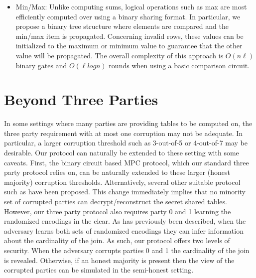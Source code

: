 \begin{itemize}
	\item  Min/Max: Unlike computing sums, logical operations such as max are most efficiently computed over using a binary sharing format. In particular, we propose a binary tree structure where elements are compared and the min/max item is propagated. Concerning invalid rows, these values can be initialized to the maximum or minimum value to guarantee that the other value will be propagated. The overall complexity of this approach is $O(n\ell)$ binary gates and $O(\ell log n)$ rounds when using a basic comparison circuit\cite{aby3}.
\end{itemize}

\section{Beyond Three Parties}


In some settings where many parties are providing tables to be computed on, the three party requirement with at most one corruption may not be adequate. In particular, a larger corruption threshold such as 3-out-of-5 or 4-out-of-7 may be desirable. Our protocol can naturally be extended to these setting with some caveats. First, the binary circuit based MPC protocol\cite{highthroughput}, which our standard three party protocol relies on, can be naturally extended to these larger (honest majority) corruption thresholds. Alternatively, several other suitable protocol such as\cite{DBLP:conf/crypto/ChidaGHIKLN18} have been proposed. This change immediately implies that no minority set of corrupted parties can decrypt/reconstruct the secret shared tables. However, our three party protocol also requires party 0 and 1 learning the randomized encodings in the clear.  As has previously been described, when the adversary learns both sets of randomized encodings they can infer information about the cardinality of the join. As such, our protocol offers two levels of security. When the adversary corrupts parties 0 and 1 the cardinality of the join is revealed. Otherwise, if an honest majority is present then the view of the corrupted parties can be simulated in the semi-honest setting. 



